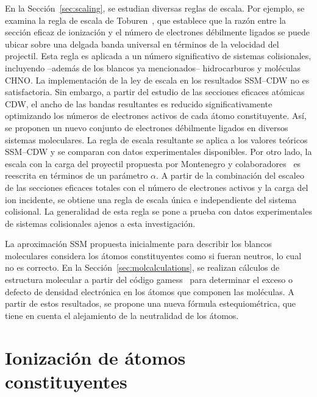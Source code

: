 En la Sección~\ref{sec:scaling}, se estudian diversas reglas de escala. 
Por ejemplo, se examina la regla de escala de Toburen~\cite{Toburen:75,
Toburen:76}, que establece que la razón entre la sección eficaz de 
ionización y el número de electrones débilmente ligados se puede ubicar 
sobre una delgada banda universal en términos de la velocidad del 
projectil. Esta regla es aplicada a un número significativo de sistemas 
colisionales, incluyendo --además de los blancos ya mencionados-- 
hidrocarburos y moléculas CHNO. La implementación de la ley de escala en 
los resultados SSM--CDW no es satisfactoria. Sin embargo, a partir del 
estudio de las secciones eficaces atómicas CDW, el ancho de las bandas 
resultantes es reducido significativamente optimizando los números de 
electrones activos de cada átomo constituyente. Así, se proponen un 
nuevo conjunto de electrones débilmente ligados en diversos sistemas 
moleculares. La regla de escala resultante se aplica a los valores 
teóricos SSM--CDW y se comparan con datos experimentales disponibles. 
Por otro lado, la escala con la carga del proyectil propuesta por 
Montenegro y colaboradores~\cite{Dubois:13,Montenegro:13} es reescrita 
en términos de un parámetro $\alpha$. A partir de la combinación del 
escaleo de las secciones eficaces totales con el número de electrones 
activos y la carga del ion incidente, se obtiene una regla de escala 
única e independiente del sistema colisional. La generalidad de esta 
regla se pone a prueba con datos experimentales de sistemas 
colisionales ajenos a esta investigación.

La aproximación SSM propuesta inicialmente para describir los blancos 
moleculares considera los átomos constituyentes como si fueran 
neutros, lo cual no es correcto. En la Sección~\ref{sec:molcalculations}, 
se realizan cálculos de estructura molecular a partir del código 
{\sc gamess}~\cite{gamess} para determinar el exceso o defecto de 
densidad electrónica en los átomos que componen las moléculas. A partir 
de estos resultados, se propone una nueva fórmula estequiométrica, que 
tiene en cuenta el alejamiento de la neutralidad de los átomos. 

\section{Ionización de átomos constituyentes}
\label{sec:atoms}

